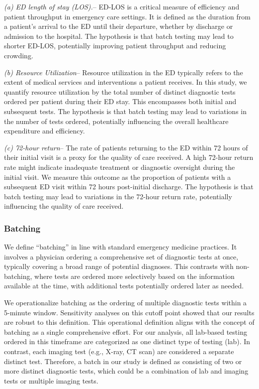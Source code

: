 \documentclass[,,nonblindrev]{informs}
\begin{document}
\emph{(a) ED length of stay (LOS).}-- ED-LOS is a critical measure of
efficiency and patient throughput in emergency care settings. It is
defined as the duration from a patient's arrival to the ED until their
departure, whether by discharge or admission to the hospital. The
hypothesis is that batch testing may lead to shorter ED-LOS, potentially
improving patient throughput and reducing crowding.

\emph{(b) Resource Utilization}-- Resource utilization in the ED
typically refers to the extent of medical services and interventions a
patient receives. In this study, we quantify resource utilization by the
total number of distinct diagnostic tests ordered per patient during
their ED stay. This encompasses both initial and subsequent tests. The
hypothesis is that batch testing may lead to variations in the number of
tests ordered, potentially influencing the overall healthcare
expenditure and efficiency.

\emph{(c) 72-hour return}-- The rate of patients returning to the ED
within 72 hours of their initial visit is a proxy for the quality of
care received. A high 72-hour return rate might indicate inadequate
treatment or diagnostic oversight during the initial visit. We measure
this outcome as the proportion of patients with a subsequent ED visit
within 72 hours post-initial discharge. The hypothesis is that batch
testing may lead to variations in the 72-hour return rate, potentially
influencing the quality of care received.

\hypertarget{batching}{%
\subsubsection{Batching}\label{batching}}

We define ``batching'' in line with standard emergency medicine
practices. It involves a physician ordering a comprehensive set of
diagnostic tests at once, typically covering a broad range of potential
diagnoses. This contrasts with non-batching, where tests are ordered
more selectively based on the information available at the time, with
additional tests potentially ordered later as needed.

We operationalize batching as the ordering of multiple diagnostic tests
within a 5-minute window. Sensitivity analyses on this cutoff point
showed that our results are robust to this definition. This operational
definition aligns with the concept of batching as a single comprehensive
effort. For our analysis, all lab-based testing ordered in this
timeframe are categorized as one distinct type of testing (lab). In
contrast, each imaging test (e.g., X-ray, CT scan) are considered a
separate distinct test. Therefore, a batch in our study is defined as
consisting of two or more distinct diagnostic tests, which could be a
combination of lab and imaging tests or multiple imaging tests.
\end{document}
